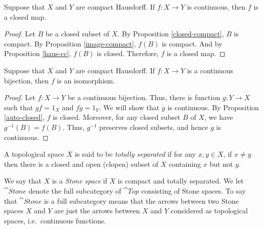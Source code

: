 \begin{prop} Suppose that $X$ and $Y$ are compact Hausdorff.  If
  $f:X\to Y$ is continuous, then $f$ is a closed
  map. \label{auto-closed} \end{prop}

\begin{proof} Let $B$ be a closed subset of $X$.  By Proposition
  \ref{closed-compact}, $B$ is compact.  By Proposition
  \ref{image-compact}, $f(B)$ is compact.  And by Proposition
  \ref{haus-cc}, $f(B)$ is closed.  Therefore, $f$ is a closed map.
\end{proof}



\begin{prop} Suppose that $X$ and $Y$ are compact Hausdorff.  If
  $f:X\to Y$ is a continuous bijection, then $f$ is an
  isomorphism. \label{chaus-bi} \end{prop}

\begin{proof} Let $f:X\to Y$ be a continuous bijection.  Thus, there
  is function $g:Y\to X$ such that $gf=1_X$ and $fg=1_Y$.  We will
  show that $g$ is continuous.  By Proposition \ref{auto-closed}, $f$
  is closed.  Moreover, for any closed subset $B$ of $X$, we have
  $g^{-1}(B)=f(B)$.  Thus, $g^{-1}$ preserves closed subsets, and
  hence $g$ is continuous.
\end{proof}




\begin{defn} A topological space $X$ is said to be \emph{totally
    separated} if for any $x,y\in X$, if $x\neq y$ then there is a
  closed and open (clopen) subset of $X$ containing $x$ but not
  $y$. \end{defn}

\begin{defn} We say that $X$ is a \emph{Stone space} if $X$ is compact
  and totally separated.  We let $\cat{Stone}$ denote the full
  subcategory of $\cat{Top}$ consisting of Stone spaces.  To say that
  $\cat{Stone}$ is a full subcategory means that the arrows between
  two Stone spaces $X$ and $Y$ are just the arrows between $X$ and $Y$
  considered as topological spaces, i.e.\ continuous
  functions.  \end{defn}

